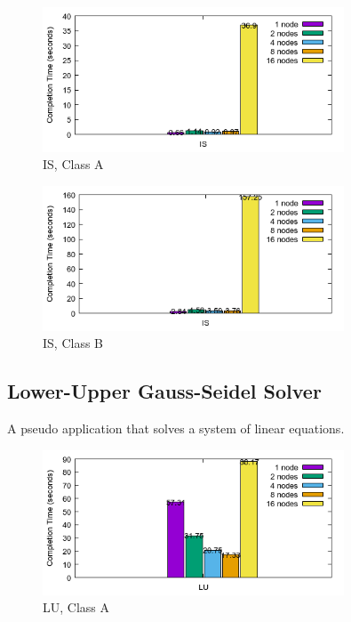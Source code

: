 \documentclass[a4paper]{article}
\begin{document}
\begin{figure}[H]
\centering
\includegraphics[width=0.8\textwidth]{figures/ISvA.png}
\caption{\label{fig:ISvA}IS, Class A}
\end{figure}

\begin{figure}[H]
\centering
\includegraphics[width=0.8\textwidth]{figures/ISvB.png}
\caption{\label{fig:ISvB}IS, Class B}
\end{figure}

\subsection{Lower-Upper Gauss-Seidel Solver}

A pseudo application that solves a system of linear equations.

\begin{figure}[H]
\centering
\includegraphics[width=0.8\textwidth]{figures/LUvA.png}
\caption{\label{fig:LUvA}LU, Class A}
\end{figure}
\end{document}
